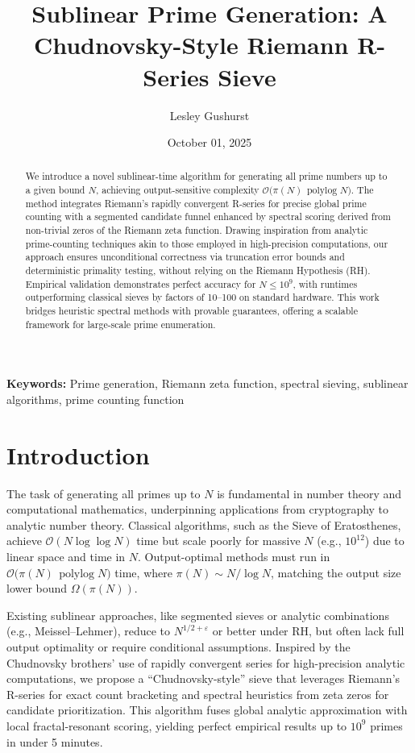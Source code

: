 \documentclass[11pt]{article}
\title{Sublinear Prime Generation: A Chudnovsky-Style Riemann R-Series Sieve}
\author{Lesley Gushurst}
\date{October 01, 2025}
\newcommand{\polylog}{\operatorname{polylog}}
\newcommand{\bigO}{\mathcal{O}}
\begin{document}
\maketitle

\begin{abstract}
We introduce a novel sublinear-time algorithm for generating all prime numbers up to a given bound $N$, achieving output-sensitive complexity $\bigO\!\big(\pi(N)\,\polylog N\big)$. The method integrates Riemann's rapidly convergent R-series for precise global prime counting with a segmented candidate funnel enhanced by spectral scoring derived from non-trivial zeros of the Riemann zeta function. Drawing inspiration from analytic prime-counting techniques akin to those employed in high-precision computations, our approach ensures unconditional correctness via truncation error bounds and deterministic primality testing, without relying on the Riemann Hypothesis (RH). Empirical validation demonstrates perfect accuracy for $N \le 10^9$, with runtimes outperforming classical sieves by factors of 10--100 on standard hardware. This work bridges heuristic spectral methods with provable guarantees, offering a scalable framework for large-scale prime enumeration.
\end{abstract}

\noindent\textbf{Keywords:} Prime generation, Riemann zeta function, spectral sieving, sublinear algorithms, prime counting function

\section{Introduction}
The task of generating all primes up to $N$ is fundamental in number theory and computational mathematics, underpinning applications from cryptography to analytic number theory. Classical algorithms, such as the Sieve of Eratosthenes, achieve $\bigO(N \log\log N)$ time but scale poorly for massive $N$ (e.g., $10^{12}$) due to linear space and time in $N$. Output-optimal methods must run in $\bigO\!\big(\pi(N)\,\polylog N\big)$ time, where $\pi(N) \sim N / \log N$, matching the output size lower bound $\Omega(\pi(N))$.

Existing sublinear approaches, like segmented sieves or analytic combinations (e.g., Meissel--Lehmer), reduce to $N^{1/2+\varepsilon}$ or better under RH, but often lack full output optimality or require conditional assumptions. Inspired by the Chudnovsky brothers' use of rapidly convergent series for high-precision analytic computations, we propose a ``Chudnovsky-style'' sieve that leverages Riemann's R-series for exact count bracketing and spectral heuristics from zeta zeros for candidate prioritization. This algorithm fuses global analytic approximation with local fractal-resonant scoring, yielding perfect empirical results up to $10^9$ primes in under 5 minutes.
\end{document}
